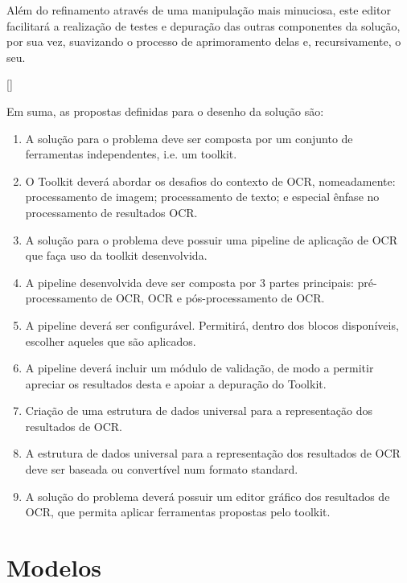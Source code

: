 Além do refinamento através de uma manipulação mais minuciosa, este editor facilitará a realização de testes e depuração das outras componentes da solução, por sua vez, suavizando o processo de aprimoramento delas e, recursivamente, o seu.


[\normalsize]



Em suma, as propostas definidas para o desenho da solução são:

\begin{enumerate}[label=\textbf{\arabic*}]\setlength\itemsep{-0.8em}
	\item A solução para o problema deve ser composta por um conjunto de ferramentas independentes, i.e. um toolkit.
	\item O Toolkit deverá abordar os desafios do contexto de OCR, nomeadamente: processamento de imagem; processamento de texto; e especial ênfase no processamento de resultados OCR.
	\item A solução para o problema deve possuir uma pipeline de aplicação de OCR que faça uso da toolkit desenvolvida.
	\item A pipeline desenvolvida deve ser composta por 3 partes principais: pré-processamento de OCR, OCR e pós-processamento de OCR.
	\item A pipeline deverá ser configurável. Permitirá, dentro dos blocos disponíveis, escolher aqueles que são aplicados.
	\item A pipeline deverá incluir um módulo de validação, de modo a permitir apreciar os resultados desta e apoiar a depuração do Toolkit.
	\item Criação de uma estrutura de dados universal para a representação dos resultados de OCR.
	\item A estrutura de dados universal para a representação dos resultados de OCR deve ser baseada ou convertível num formato standard.
	\item A solução do problema deverá possuir um editor gráfico dos resultados de OCR, que permita aplicar ferramentas propostas pelo toolkit.
\end{enumerate}


\section{Modelos}

